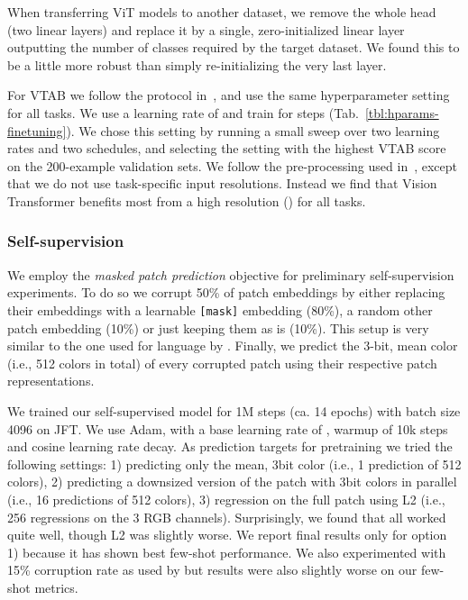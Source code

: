 \documentclass{article} \usepackage{iclr2021_conference,times}
\newcommand{\oursfull}{Vision Transformer\xspace}
\begin{document}
When transferring ViT models to another dataset, we remove the whole head (two linear layers) and replace it by a single, zero-initialized linear layer outputting the number of classes required by the target dataset.
We found this to be a little more robust than simply re-initializing the very last layer.

For VTAB we follow the protocol in~\citet{kolesnikov2020-bit}, and use the same hyperparameter setting for all tasks.
We use a learning rate of  and train for  steps (Tab.~\ref{tbl:hparams-finetuning}).
We chose this setting by running a small sweep over two learning rates and two schedules, and selecting the setting with the highest VTAB score on the 200-example validation sets.
We follow the pre-processing used in~\cite{kolesnikov2020-bit}, except that we do not use task-specific input resolutions.
Instead we find that \oursfull{} benefits most from a high resolution () for all tasks.

\subsubsection{Self-supervision}\label{sec:self_supervision}

We employ the \textit{masked patch prediction} objective for preliminary self-supervision experiments. To do so we corrupt 50\% of patch embeddings by either replacing their embeddings with a learnable \verb|[mask]| embedding (80\%), a random other patch embedding (10\%) or just keeping them as is (10\%). This setup is very similar to the one used for language by \citet{devlin19-bert}. Finally, we predict the 3-bit, mean color (i.e., 512 colors in total) of every corrupted patch using their respective patch representations.

We trained our self-supervised model for 1M steps (ca. 14 epochs) with batch size 4096 on JFT. We use Adam, with a base learning rate of , warmup of 10k steps and cosine learning rate decay. As prediction targets for pretraining we tried the following settings: 1) predicting only the mean, 3bit color (i.e., 1 prediction of 512 colors), 2) predicting a  downsized version of the  patch with 3bit colors in parallel (i.e., 16 predictions of 512 colors), 3) regression on the full patch using L2 (i.e., 256 regressions on the 3 RGB channels). Surprisingly, we found that all worked quite well, though L2 was slightly worse. We report final results only for option 1) because it has shown best few-shot performance. We also experimented with 15\% corruption rate as used by \citet{devlin19-bert} but results were also slightly worse on our few-shot metrics.
\end{document}
